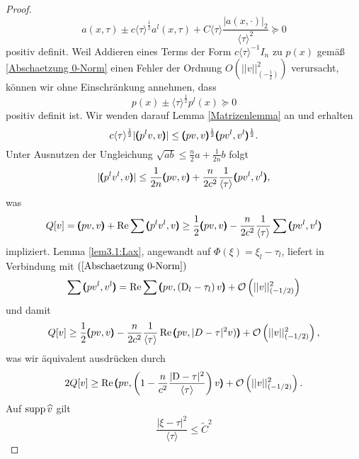 \begin{proof}
\begin{equation}
	a(x,\tau) \pm c\langle\tau\rangle^{\frac{1}{2}}a^l(x,\tau)+C\langle\tau\rangle \frac{| a(x,\cdot)|_{2}}{\langle\tau\rangle^2}\succeq 0
\end{equation}
positiv definit. Weil Addieren eines Terms der Form $c \langle\tau\rangle^{-1} I_n$ zu $p(x)$ gemäß \eqref{Abschaetzung 0-Norm} einen Fehler der Ordnung $O\left(\vert\vert v\vert\vert_{\left(-\frac{1}{2}\right)}^2\right)$ verursacht, können wir ohne Einschränkung annehmen, dass  
\begin{equation}
	p(x) \pm \langle\tau\rangle^{\frac{1}{2}}p^l(x) \succeq 0
\end{equation}
positiv definit ist. Wir wenden darauf Lemma \ref{Matrizenlemma} an und erhalten
\begin{equation}
	c\langle\tau\rangle^{\frac{1}{2}} |\pmb(p^lv,v\pmb)|\le\pmb(pv,v\pmb)^{\frac{1}{2}}\pmb(pv^l,v^l\pmb)^{\frac{1}{2}}.
\end{equation}
Unter Ausnutzen der Ungleichung $\sqrt{ab}\le \frac{n}{2}a+\frac{1}{2n}b$ folgt
\begin{equation}
	|\pmb(p^lv^l,v\pmb)|\le \frac{1}{2n}\pmb(pv,v\pmb)+\frac{n}{2c^2}\frac{1}{\langle\tau\rangle}\pmb(pv^l,v^l\pmb),
\end{equation}
was
\begin{equation}
	Q[ v]=\pmb(pv,v\pmb)+\operatorname{Re}\sum\pmb(p^lv^l,v\pmb) \ge \frac{1}{2}\pmb(pv,v\pmb) -\frac{n}{2c^2}\frac{1}{\langle\tau\rangle}\sum\pmb(pv^l,v^l\pmb)
\end{equation}
impliziert. Lemma \ref{lem3.1:Lax}, angewandt auf $\Phi(\xi) = \xi_l-\tau_l$, liefert in Verbindung mit $(\ref{Abschaetzung 0-Norm})$
\begin{equation}
\sum\pmb(pv^l,v^l\pmb)=\operatorname{Re}\sum \pmb(pv,\left(\mathrm D_l-\tau_l\right)v\pmb)+\mathcal{O}\left(|| v||_{\left(-{1}/{2}\right)}^2\right) 
\end{equation}
und damit
\begin{equation}
	Q[v] \ge \frac{1}{2}\pmb(pv,v\pmb)-\frac{n}{2c^2}\frac{1}{\langle\tau\rangle}\operatorname{Re}\pmb(pv,| D-\tau|^2v)\pmb)+\mathcal{O}\left(|| v||_{\left(-{1}/{2}\right)}^2\right),
\end{equation}
was wir äquivalent ausdrücken durch
\begin{equation}
	2Q[v] \ge \operatorname{Re}\pmb(pv,\left(1-\frac{n}{c^2}\frac{| \mathrm D-\tau|^2}{\langle\tau\rangle}\right)v\pmb)+\mathcal{O}\left(|| v||_{\left(-{1}/{2}\right)}^2\right).
\end{equation}
Auf $\operatorname{supp}\widehat{v}$ gilt
\begin{equation}
	\frac{|\xi-\tau|^2}{\langle\tau\rangle}\le \tilde{C}^2 
\end{equation}

\end{proof}
